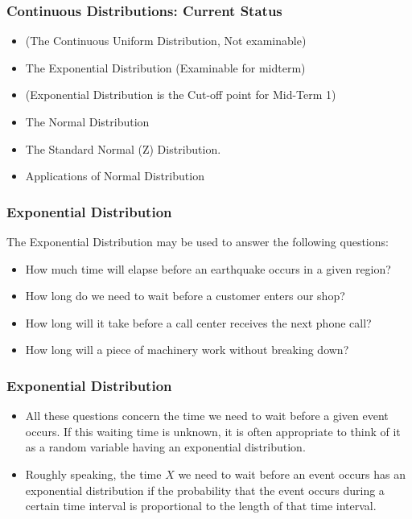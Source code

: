 \begin{frame}[fragile]
\frametitle{Continuous Distributions: Current Status}
\begin{itemize}
\item (The Continuous Uniform Distribution, Not examinable)
\item The Exponential Distribution (Examinable for midterm)
\item (Exponential Distribution is the Cut-off point for Mid-Term 1)
\item The Normal Distribution
\item The Standard Normal (Z) Distribution.
\item Applications of Normal Distribution
\end{itemize}
\end{frame}

\begin{frame}[fragile]
\frametitle{Exponential Distribution}
The Exponential Distribution may be used to answer the following questions:
\begin{itemize}
\item How much time will elapse before an earthquake occurs in a given region?
\item How long do we need to wait before a customer enters our shop?
\item How long will it take before a call center receives the next phone call?
\item How long will a piece of machinery work without breaking down?
\end{itemize}
\end{frame}

\begin{frame}[fragile]
\frametitle{Exponential Distribution}

\begin{itemize}
\item All these questions concern the time we need to wait before a given event occurs. If this waiting time is unknown, it is often appropriate to think of it as a random variable having an exponential distribution.
\item Roughly speaking, the time $X$ we need to wait before an event occurs has an exponential distribution if the probability that the event occurs during a certain time interval is proportional to the length of that time interval.

\end{itemize}
\end{frame}

